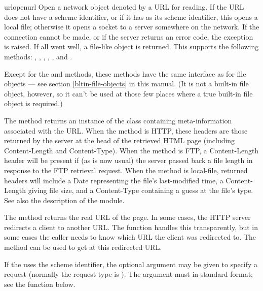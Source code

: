 \begin{funcdesc}{urlopen}{url}
Open a network object denoted by a URL for reading.  If the URL does
not have a scheme identifier, or if it has  as its scheme
identifier, this opens a local file; otherwise it opens a socket to a
server somewhere on the network.  If the connection cannot be made, or
if the server returns an error code, the  exception
is raised.  If all went well, a file-like object is returned.  This
supports the following methods: , ,
, , ,
 and .

Except for the  and  methods,
these methods have the same interface as for
file objects --- see section \ref{bltin-file-objects} in this
manual.  (It is not a built-in file object, however, so it can't be
used at those few places where a true built-in file object is
required.)

The  method returns an instance of the class
 containing meta-information associated
with the URL.  When the method is HTTP, these headers are those
returned by the server at the head of the retrieved HTML page
(including Content-Length and Content-Type).  When the method is FTP,
a Content-Length header will be present if (as is now usual) the
server passed back a file length in response to the FTP retrieval
request.  When the method is local-file, returned headers will include
a Date representing the file's last-modified time, a Content-Length
giving file size, and a Content-Type containing a guess at the file's
type. See also the description of the
 module.

The  method returns the real URL of the page.  In
some cases, the HTTP server redirects a client to another URL.  The
 function handles this transparently, but in some
cases the caller needs to know which URL the client was redirected
to.  The  method can be used to get at this
redirected URL.

If the  uses the  scheme identifier, the optional
 argument may be given to specify a  request
(normally the request type is ).  The  argument
must in standard  format;
see the  function below.


\end{funcdesc}
